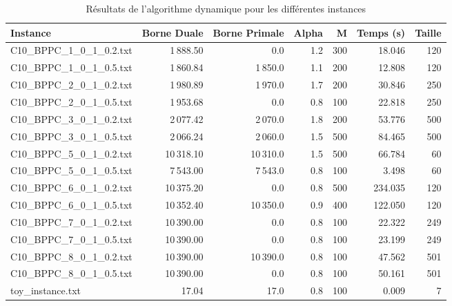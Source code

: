 \begin{table}[htbp]
	\centering
	\label{tab:resultats_dyna}
	\begin{tabular}{lrrrrrr}
		\hline
		\textbf{Instance} & \textbf{Borne Duale} & \textbf{Borne Primale} & \textbf{Alpha} & \textbf{M} & \textbf{Temps (s)} & \textbf{Taille} \\
		\hline
		C10\_BPPC\_1\_0\_1\_0.2.txt & 1\,888.50 & 0.0 & 1.2 & 300 & 18.046 & 120 \\
		C10\_BPPC\_1\_0\_1\_0.5.txt & 1\,860.84 & 1\,850.0 & 1.1 & 200 & 12.808 & 120 \\
		C10\_BPPC\_2\_0\_1\_0.2.txt & 1\,980.89 & 1\,970.0 & 1.7 & 200 & 30.846 & 250 \\
		C10\_BPPC\_2\_0\_1\_0.5.txt & 1\,953.68 & 0.0 & 0.8 & 100 & 22.818 & 250 \\
		C10\_BPPC\_3\_0\_1\_0.2.txt & 2\,077.42 & 2\,070.0 & 1.8 & 200 & 53.776 & 500 \\
		C10\_BPPC\_3\_0\_1\_0.5.txt & 2\,066.24 & 2\,060.0 & 1.5 & 500 & 84.465 & 500 \\
		C10\_BPPC\_5\_0\_1\_0.2.txt & 10\,318.10 & 10\,310.0 & 1.5 & 500 & 66.784 & 60 \\
		C10\_BPPC\_5\_0\_1\_0.5.txt & 7\,543.00 & 7\,543.0 & 0.8 & 100 & 3.498 & 60 \\
		C10\_BPPC\_6\_0\_1\_0.2.txt & 10\,375.20 & 0.0 & 0.8 & 500 & 234.035 & 120 \\
		C10\_BPPC\_6\_0\_1\_0.5.txt & 10\,352.40 & 10\,350.0 & 0.9 & 400 & 122.050 & 120 \\
		C10\_BPPC\_7\_0\_1\_0.2.txt & 10\,390.00 & 0.0 & 0.8 & 100 & 22.322 & 249 \\
		C10\_BPPC\_7\_0\_1\_0.5.txt & 10\,390.00 & 0.0 & 0.8 & 100 & 23.199 & 249 \\
		C10\_BPPC\_8\_0\_1\_0.2.txt & 10\,390.00 & 10\,390.0 & 0.8 & 100 & 47.562 & 501 \\
		C10\_BPPC\_8\_0\_1\_0.5.txt & 10\,390.00 & 0.0 & 0.8 & 100 & 50.161 & 501 \\
		toy\_instance.txt & 17.04 & 17.0 & 0.8 & 100 & 0.009 & 7 \\
		\hline
	\end{tabular}
	\caption{Résultats de l'algorithme dynamique pour les différentes instances}
\end{table}